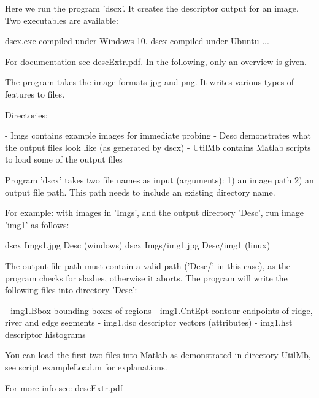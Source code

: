 Here we run the program 'dscx'. It creates the descriptor output for an image. Two
executables are available:

dscx.exe    compiled under Windows 10.
dscx	    compiled under Ubuntu ...

For documentation see descExtr.pdf. In the following, only an overview is given.

The program takes the image formats jpg and png. It writes various types of features
to files.

Directories: 

- Imgs	 contains example images for immediate probing
- Desc   demonstrates what the output files look like (as generated by dscx) 
- UtilMb contains Matlab scripts to load some of the output files

Program 'dscx' takes two file names as input (arguments):
   1) an image path
   2) an output file path. This path needs to include an existing directory name.

For example: with images in 'Imgs', and the output directory 'Desc', run image 'img1'
as follows:

   dscx Imgs\img1.jpg Desc	   (windows)
   dscx Imgs/img1.jpg Desc/img1	   (linux)

The output file path must contain a valid path ('Desc/' in this case), as the
program checks for slashes, otherwise it aborts. The program will write the
following files into directory 'Desc':

    - img1.Bbox	    bounding boxes of regions
    - img1.CntEpt   contour endpoints of ridge, river and edge segments 
    - img1.dsc	    descriptor vectors (attributes)
    - img1.hst	    descriptor histograms

You can load the first two files into Matlab as demonstrated in directory UtilMb,
see script exampleLoad.m for explanations.

For more info see: descExtr.pdf


